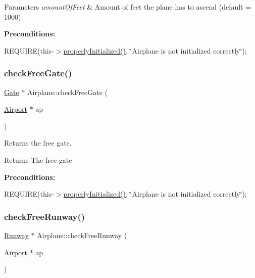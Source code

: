 \begin{DoxyParams}{Parameters}
{\em amount\+Of\+Feet} & Amount of feet the plane has to ascend (default = 1000)\\
\hline
\end{DoxyParams}
{\bfseries Preconditions\+:}
\begin{DoxyItemize}
\item R\+E\+Q\+U\+I\+RE(this-\/$>$\mbox{\hyperlink{class_airplane_a6f80df8f692cc8d67d292c1e9f26d59e}{properly\+Initialized()}}, \char`\"{}\+Airplane is not initialized correctly\char`\"{}); 
\end{DoxyItemize}\mbox{\label{class_airplane_abe2aa4a30f2ba93153ab31e9b7a6be21}} 
\subsubsection{\texorpdfstring{check\+Free\+Gate()}{checkFreeGate()}}
{\footnotesize\ttfamily \mbox{\hyperlink{class_gate}{Gate}} $\ast$ Airplane\+::check\+Free\+Gate (\begin{DoxyParamCaption}\item[{\mbox{\hyperlink{class_airport}{Airport}} $\ast$}]{ap }\end{DoxyParamCaption})}



Returns the free gate. 

\begin{DoxyReturn}{Returns}
The free gate
\end{DoxyReturn}
{\bfseries Preconditions\+:}
\begin{DoxyItemize}
\item R\+E\+Q\+U\+I\+RE(this-\/$>$\mbox{\hyperlink{class_airplane_a6f80df8f692cc8d67d292c1e9f26d59e}{properly\+Initialized()}}, \char`\"{}\+Airplane is not initialized correctly\char`\"{}); 
\end{DoxyItemize}\mbox{\label{class_airplane_a8147ddb6b797ef4d7d23c749b1d323f2}} 
\subsubsection{\texorpdfstring{check\+Free\+Runway()}{checkFreeRunway()}}
{\footnotesize\ttfamily \mbox{\hyperlink{class_runway}{Runway}} $\ast$ Airplane\+::check\+Free\+Runway (\begin{DoxyParamCaption}\item[{\mbox{\hyperlink{class_airport}{Airport}} $\ast$}]{ap }\end{DoxyParamCaption})}



